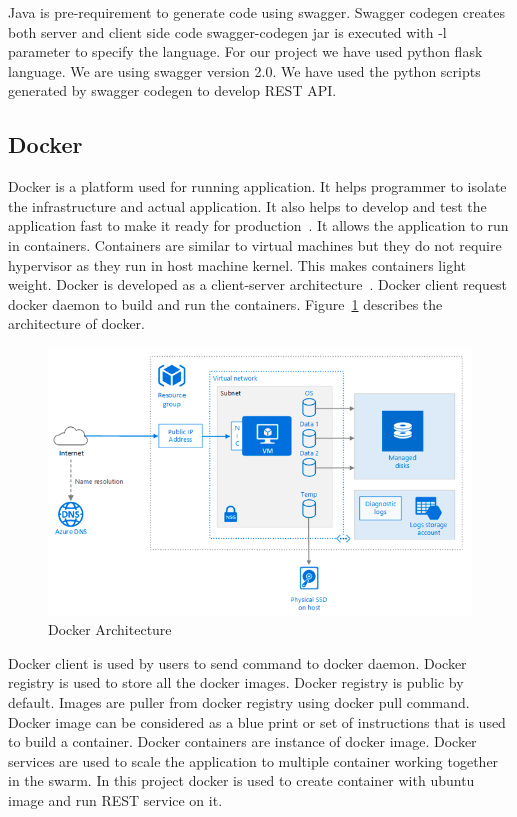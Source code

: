 Java is pre-requirement to generate code using swagger. Swagger codegen creates
both server and client side code swagger-codegen jar is executed with -l
parameter to specify the language. For our project we have used python flask
language. We are using swagger version 2.0. We have used the python scripts
generated by swagger codegen to develop REST API.


\subsection{Docker}
Docker is a platform used for running application. It helps programmer to
isolate the infrastructure and actual application. It also helps to develop and
test the application fast to make it ready for
production~\cite{hid-sp18-502-docker}. It allows the
application to run in containers. Containers are similar to virtual machines
but they do not require hypervisor as they run in host machine kernel. This
makes containers light weight. Docker is developed as a client-server
architecture~\cite{hid-sp18-502-docker}. Docker client request docker daemon to
build and run the
containers. Figure~\ref{f:docker} describes the architecture of
docker.

\begin{figure}[!ht]
  \centering\includegraphics[width=\columnwidth]{image/docker-architecture.PNG}
  \caption{Docker Architecture~\cite{hid-sp18-502-docker}}\label{f:docker}
\end{figure}

Docker client is used by users to send command to docker daemon. Docker
registry is used to store all the docker images\cite{hid-sp18-502-docker}.
Docker registry is public by
default. Images are puller from docker registry using docker pull command.
Docker image can be considered as a blue print or set of instructions that is
used to build a container\cite{hid-sp18-502-docker}. Docker containers are
instance of docker image. Docker services are used to scale the application to
multiple container working
together in the swarm\cite{hid-sp18-502-docker}. In this project docker is used
to create container with ubuntu image and run REST service on it.

